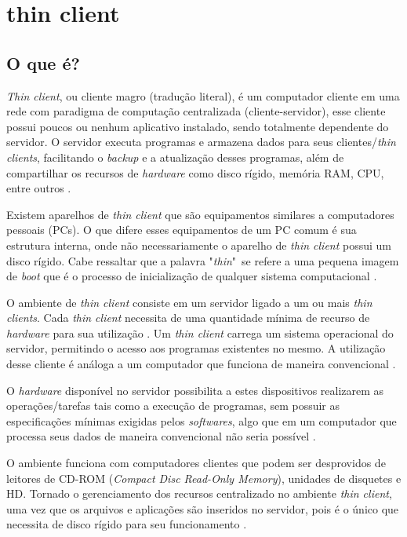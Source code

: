 \documentclass[
	12pt,				%
	openright,			%
	twoside,			%
	a4paper,			%
	chapter=TITLE,		%
	english,			%
	brazil				%
	]{abntex2}
\begin{document}
\chapter{thin client}
\label{refe:thinclient}
\section{O que é?}

\textit{Thin client}, ou cliente magro (tradução literal), é um computador cliente em uma rede  com paradigma de computação centralizada (cliente-servidor), esse cliente possui poucos ou nenhum aplicativo instalado, sendo totalmente dependente do servidor. O servidor executa programas e armazena dados para seus clientes/\textit{thin clients}, facilitando o \textit{backup} e a atualização desses programas, além de compartilhar os recursos de \textit{hardware} como disco rígido, memória RAM, CPU, entre outros \cite{ComoFuncionaThinClient, tanenbaum2010sistemas}.

Existem aparelhos de \textit{thin client} que são equipamentos similares a computadores pessoais (PCs). O que difere esses equipamentos de um PC comum é sua estrutura interna, onde não necessariamente o aparelho de \textit{thin client} possui um disco rígido. Cabe ressaltar que a palavra "\textit{thin}"\ se refere a uma pequena imagem de \textit{boot} que é o processo de inicialização de qualquer sistema computacional \cite{ComoFuncionaThinClient}.

O ambiente de \textit{thin client} consiste em um servidor ligado a um ou mais \textit{thin clients}. Cada \textit{thin client} necessita de uma quantidade mínima de recurso de \textit{hardware} para sua utilização \cite{TopologiaClienteThin}. Um \textit{thin client} carrega um sistema operacional do servidor, permitindo o acesso aos  programas existentes no mesmo. A utilização desse cliente é análoga a um computador que funciona de maneira convencional \cite{ComoFuncionaThinClient, morimotoservidores}.

O \textit{hardware} disponível no servidor possibilita a estes dispositivos realizarem as operações/tarefas tais como a execução de programas, sem possuir as especificações mínimas exigidas pelos \textit{softwares}, algo que em um computador que processa seus dados de maneira convencional não seria possível \cite{tanenbaum2010sistemas}.

O ambiente funciona com computadores clientes que podem ser desprovidos de leitores de CD-ROM (\textit{Compact Disc Read-Only Memory}), unidades de disquetes e HD. Tornado o gerenciamento dos recursos centralizado no ambiente \textit{thin client}, uma vez que os  arquivos e aplicações são inseridos no servidor, pois é o único que necessita de disco rígido para seu funcionamento \cite{tanenbaum2010sistemas, ComoFuncionaThinClient}.
\end{document}
